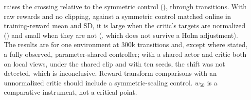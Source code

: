 raises the crossing relative to the symmetric control (\VjtPAsymBoth{}), through \MaxConfirmationBudget{} transitions. With raw rewards and no clipping, against a symmetric control matched online in training-reward mean and SD, it is large when the critic's targets are normalized (\VjtPAMonPop{}) and small when they are not (\VjtPAMonPlain{}, which does not survive a Holm adjustment). The results are for one environment at 300k transitions and, except where stated, a fully observed, parameter-shared controller; with a shared actor and critic both on local views, under the shared clip and with ten seeds, the shift was not detected, which is inconclusive. Reward-transform comparisons with an unnormalized critic should include a symmetric-scaling control. $w_{50}$ is a comparative instrument, not a critical point.
